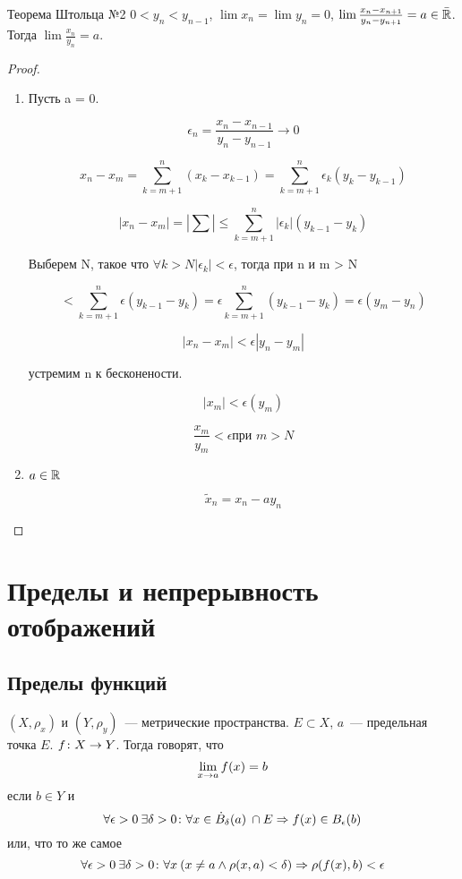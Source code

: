 \begin{theorem}{Теорема Штольца №2}
$0<y_n<y_{n-1}$, $\lim x_n = \lim y_n = 0$, $\lim \frac{x_n-x_{n+1}}{y_n-y_{n+1}} = a \in \bar{\mathbb{R}}$.
Тогда $\lim \frac{x_n}{y_n} = a$.
\end{theorem}
\begin{proof}
\begin{enumerate}
\item Пусть a = 0.

$$\epsilon_n = \frac{x_n - x_{n - 1}}{y_n - y_{n - 1}} \to 0$$

$$x_n - x_m = \sum_{k = m + 1}^{n}(x_k - x_{k - 1}) = \sum_{k = m + 1}^{n}\epsilon_k(y_k - y_{k - 1})$$

$$|x_n - x_m| = |\sum| \le \sum_{k = m + 1}^{n}|\epsilon_k|(y_{k - 1} - y_k)$$

Выберем N, такое что $\forall k > N |\epsilon_k| < \epsilon$, тогда при n и m > N 

$$< \sum^{n}_{k = m + 1}\epsilon(y_{k - 1} - y_k) = \epsilon\sum_{k = m + 1}^{n}(y_{k - 1} - y_k) = \epsilon(y_m - y_n)$$

$$|x_n - x_m| < \epsilon|y_n - y_m|$$

устремим n  к бесконености.

$$|x_m| < \epsilon(y_m)$$

$$\frac{x_m}{y_m} < \epsilon \text{при $m > N$}$$

\item $a \in \mathbb{R}$

$$\tilde x_n = x_n - a y_n$$
\end{enumerate}
\end{proof}

\chapter{Пределы и непрерывность отображений}
\section{Пределы функций}

\begin{Def}
$(X, \rho_x)$ и $(Y, \rho_y)$~--- метрические пространства. $E \subset X$, $a$~--- предельная точка $E$. $f\colon X \rightarrow Y$.
Тогда говорят, что
$$\lim_{x \rightarrow a} f(x) = b$$
если $b \in Y$ и
$$\forall \epsilon>0\: \exists \delta > 0\colon \forall x \in \dot B_\delta(a)\: \cap E \Rightarrow f(x) \in B_\epsilon (b)$$
или, что то же самое
$$\forall \epsilon>0\: \exists \delta > 0\colon \forall x\: (x \ne a \land \rho(x, a) < \delta) \Rightarrow \rho(f(x), b) < \epsilon$$
\end{Def}


